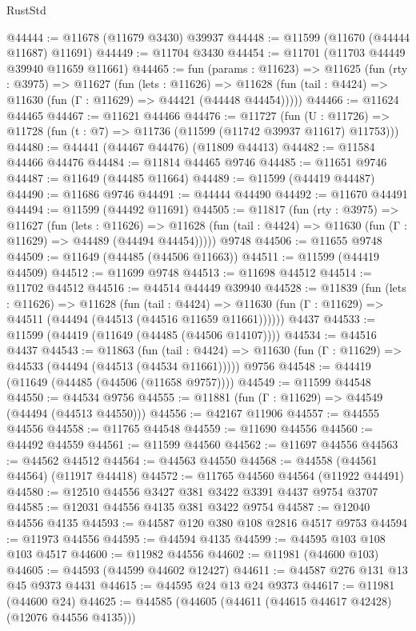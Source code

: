 \begin{lexlean}{RustStd}
\begin{coremodule}
@44444 := @11678 (@11679 @3430) @39937
@44448 := @11599 (@11670 (@44444 @11687) @11691)
@44449 := @11704 @3430
@44454 := @11701 (@11703 @44449 @39940 @11659 @11661)
@44465 := fun (params : @11623) =>
  @11625
    (fun (rty : @3975) =>
    @11627
      (fun (lets : @11626) =>
      @11628 (fun (tail : @4424) => @11630 (fun (Γ : @11629) => @44421 (@44448 @44454)))))
@44466 := @11624 @44465
@44467 := @11621 @44466
@44476 := @11727
    (fun (U : @11726) => @11728 (fun (t : @7) => @11736 (@11599 (@11742 @39937 @11617) @11753)))
@44480 := @44441 (@44467 @44476) (@11809 @44413)
@44482 := @11584 @44466 @44476
@44484 := @11814 @44465 @9746
@44485 := @11651 @9746
@44487 := @11649 (@44485 @11664)
@44489 := @11599 (@44419 @44487)
@44490 := @11686 @9746
@44491 := @44444 @44490
@44492 := @11670 @44491
@44494 := @11599 (@44492 @11691)
@44505 := @11817
    (fun (rty : @3975) =>
    @11627
      (fun (lets : @11626) =>
      @11628 (fun (tail : @4424) => @11630 (fun (Γ : @11629) => @44489 (@44494 @44454)))))
    @9748
@44506 := @11655 @9748
@44509 := @11649 (@44485 (@44506 @11663))
@44511 := @11599 (@44419 @44509)
@44512 := @11699 @9748
@44513 := @11698 @44512
@44514 := @11702 @44512
@44516 := @44514 @44449 @39940
@44528 := @11839
    (fun (lets : @11626) =>
    @11628
      (fun (tail : @4424) =>
      @11630 (fun (Γ : @11629) => @44511 (@44494 (@44513 (@44516 @11659 @11661))))))
    @4437
@44533 := @11599 (@44419 (@11649 (@44485 (@44506 @14107))))
@44534 := @44516 @4437
@44543 := @11863
    (fun (tail : @4424) => @11630 (fun (Γ : @11629) => @44533 (@44494 (@44513 (@44534 @11661)))))
    @9756
@44548 := @44419 (@11649 (@44485 (@44506 (@11658 @9757))))
@44549 := @11599 @44548
@44550 := @44534 @9756
@44555 := @11881 (fun (Γ : @11629) => @44549 (@44494 (@44513 @44550)))
@44556 := @42167 @11906
@44557 := @44555 @44556
@44558 := @11765 @44548
@44559 := @11690 @44556
@44560 := @44492 @44559
@44561 := @11599 @44560
@44562 := @11697 @44556
@44563 := @44562 @44512
@44564 := @44563 @44550
@44568 := @44558 (@44561 @44564) (@11917 @44418)
@44572 := @11765 @44560 @44564 (@11922 @44491)
@44580 := @12510 @44556 @3427 @381 @3422 @3391 @4437 @9754 @3707
@44585 := @12031 @44556 @4135 @381 @3422 @9754
@44587 := @12040 @44556 @4135
@44593 := @44587 @120 @380 @108 @2816 @4517 @9753
@44594 := @11973 @44556
@44595 := @44594 @4135
@44599 := @44595 @103 @108 @103 @4517
@44600 := @11982 @44556
@44602 := @11981 (@44600 @103)
@44605 := @44593 (@44599 @44602 @12427)
@44611 := @44587 @276 @131 @13 @45 @9373 @4431
@44615 := @44595 @24 @13 @24 @9373
@44617 := @11981 (@44600 @24)
@44625 := @44585 (@44605 (@44611 (@44615 @44617 @42428) (@12076 @44556 @4135)))

\end{coremodule}
\end{lexlean}
